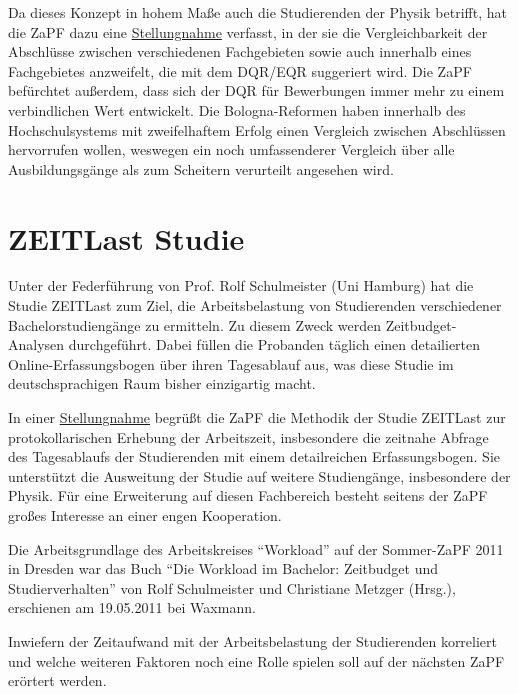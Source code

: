 \documentclass{scrartcl}
\begin{document}
Da dieses Konzept in hohem Maße auch die Studierenden der Physik betrifft, hat die ZaPF dazu eine
\href{http://zapfev.de/sites/default/files/2011_05_Stellungnahme_EQR-DQR_0.pdf}{Stellungnahme} verfasst, in der sie die
Vergleichbarkeit der Abschlüsse
zwischen verschiedenen Fachgebieten sowie auch innerhalb eines Fachgebietes anzweifelt, die mit dem DQR/EQR suggeriert
wird. Die ZaPF befürchtet außerdem, dass sich der DQR für Bewerbungen immer mehr zu einem verbindlichen Wert entwickelt.
Die Bologna-Reformen haben innerhalb des Hochschulsystems mit zweifelhaftem Erfolg einen Vergleich zwischen Abschlüssen
hervorrufen wollen, weswegen ein noch umfassenderer Vergleich über alle Ausbildungsgänge als zum Scheitern verurteilt
angesehen wird. 


\section*{ZEITLast Studie}
\vspace{-12pt}
Unter der Federführung von Prof. Rolf Schulmeister (Uni Hamburg) hat die Studie ZEITLast zum Ziel, die Arbeitsbelastung
von Studierenden verschiedener Bachelorstudiengänge zu ermitteln. Zu diesem Zweck werden Zeitbudget-Analysen
durchgeführt. Dabei füllen die Probanden täglich einen detailierten Online-Erfassungsbogen über ihren Tagesablauf aus,
was diese Studie im deutschsprachigen Raum bisher einzigartig macht.

In einer \href{http://zapfev.de/sites/default/files/2011_05_Stellungnahme_ZEITlast.pdf}{Stellungnahme} begrüßt die ZaPF
die Methodik der Studie ZEITLast zur protokollarischen Erhebung der Arbeitszeit,
insbesondere die zeitnahe Abfrage des Tagesablaufs der Studierenden mit einem detailreichen Erfassungsbogen. Sie
unterstützt die Ausweitung der Studie auf weitere Studiengänge, insbesondere der Physik. Für eine Erweiterung auf diesen
Fachbereich besteht seitens der ZaPF großes Interesse an einer engen Kooperation.

Die Arbeitsgrundlage des Arbeitskreises “Workload” auf der Sommer-ZaPF 2011 in Dresden war das Buch “Die Workload im
Bachelor: Zeitbudget und Studierverhalten” von Rolf Schulmeister und Christiane Metzger (Hrsg.), erschienen am
19.05.2011 bei Waxmann.

Inwiefern der Zeitaufwand mit der Arbeitsbelastung der Studierenden korreliert und welche weiteren Faktoren noch eine
Rolle spielen soll auf der nächsten ZaPF erörtert werden.
\end{document}
